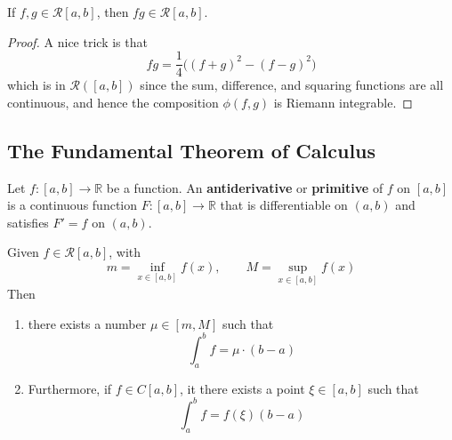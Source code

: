   \begin{theorem}
    \label{thm:products-of-riemann-integrable-functions-are}
    If $f, g \in \mathcal{R}[a, b]$, then $fg \in \mathcal{R}[a, b]$. 
  \end{theorem}
  \begin{proof}
    A nice trick is that 
    \begin{equation}
      fg = \frac{1}{4} \big( (f + g)^2 - (f - g)^2 \big) 
    \end{equation}
    which is in $\mathcal{R}([a, b])$ since the sum, difference, and squaring functions are all continuous, and hence the composition $\phi(f, g)$ is Riemann integrable. 
  \end{proof}

\subsection{The Fundamental Theorem of Calculus} 

	\begin{definition}
		\label{def:antiderivative}
		Let $f:[a,b]\to\mathbb{R}$ be a function. An \textbf{antiderivative} or \textbf{primitive} of $f$ on $[a,b]$ is a continuous function $F:[a,b]\to\mathbb{R}$ that is differentiable on $(a,b)$ and satisfies $F'=f$ on $(a,b)$.
	\end{definition}

  \begin{theorem}
    \label{thm:mean-value-theorem-of-the-integral}
    Given $f \in \mathcal{R}[a, b]$, with 
    \begin{equation}
      m = \inf_{x \in [a, b]} f(x), \qquad M = \sup_{x \in [a, b]} f(x)
    \end{equation}
    Then 
    \begin{enumerate}
      \item there exists a number $\mu \in [m, M]$ such that
      \begin{equation}
        \int_a^b f = \mu \cdot (b - a)
      \end{equation}

      \item Furthermore, if $f \in C[a, b]$, it there exists a point $\xi \in [a, b]$ such that
      \begin{equation}
        \int_a^b f = f(\xi) (b - a)
      \end{equation}
    \end{enumerate}
  \end{theorem}

